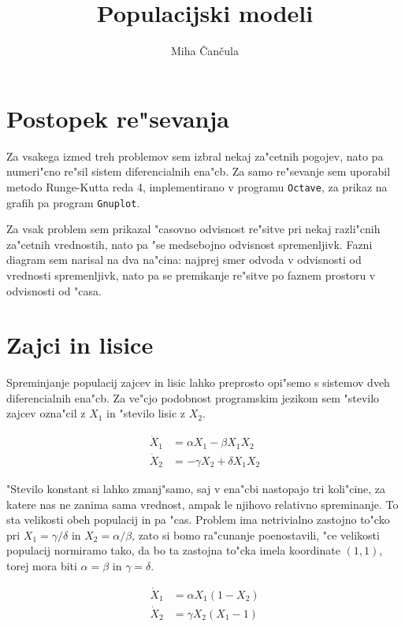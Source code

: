 \documentclass[a4paper,10pt]{article}
\title{Populacijski modeli}
\author{Miha \v Can\v cula}
\begin{document}
\maketitle

\section{Postopek re"sevanja}

Za vsakega izmed treh problemov sem izbral nekaj za"cetnih pogojev, nato pa numeri"cno re"sil sistem diferencialnih ena"cb. Za samo re"sevanje sem uporabil metodo Runge-Kutta reda 4, implementirano v programu \texttt{Octave}, za prikaz na grafih pa program \texttt{Gnuplot}. 

Za vsak problem sem prikazal "casovno odvisnost re"sitve pri nekaj razli"cnih za"cetnih vrednostih, nato pa "se medsebojno odvisnost spremenljivk. Fazni diagram sem narisal na dva na"cina: najprej smer odvoda v odvisnosti od vrednosti spremenljivk, nato pa se premikanje re"sitve po faznem prostoru v odvisnosti od "casa. 

\section{Zajci in lisice}

Spreminjanje populacij zajcev in lisic lahko preprosto opi"semo s sistemov dveh diferencialnih ena"cb. Za ve"cjo podobnost programskim jezikom sem "stevilo zajcev ozna"cil z $X_1$ in "stevilo lisic z $X_2$. 

\begin{align}
  \dot X_1 &= \alpha X_1 - \beta X_1 X_2 \\
  \dot X_2 &= -\gamma X_2 + \delta X_1 X_2
\end{align}

"Stevilo konstant si lahko zmanj"samo, saj v ena"cbi nastopajo tri koli"cine, za katere nas ne zanima sama vrednost, ampak le njihovo relativno spreminanje. To sta velikosti obeh populacij in pa "cas. Problem ima netrivialno zastojno to"cko pri $X_1 = \gamma/\delta$ in $X_2 = \alpha/\beta$, zato si bomo ra"cunanje poenostavili, "ce velikosti populacij normiramo tako, da bo ta zastojna to"cka imela koordinate $(1,1)$, torej mora biti $\alpha=\beta$ in $\gamma=\delta$. 

\begin{align}
  \dot X_1 &= \alpha X_1 ( 1 - X_2) \\
  \dot X_2 &= \gamma X_2 ( X_1 - 1)
\end{align}
\end{document}
